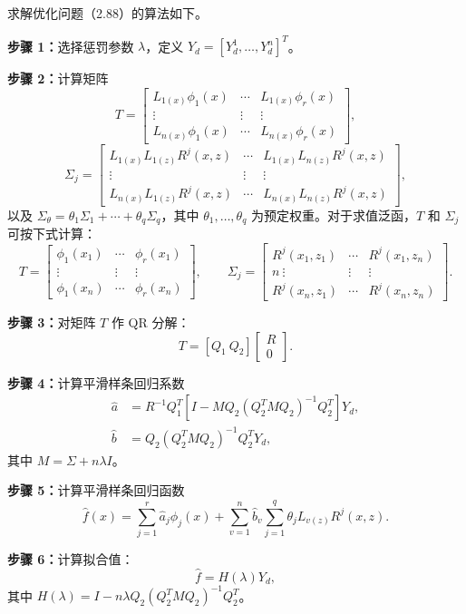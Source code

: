 求解优化问题（2.88）的算法如下。

\noindent\textbf{步骤 1：}选择惩罚参数 $\lambda$，定义 $Y_d=[Y_d^1,\ldots,Y_d^n]^T$。

\noindent\textbf{步骤 2：}计算矩阵
\[
T=\begin{bmatrix}
L_{1(x)}\phi_1(x)&\cdots&L_{1(x)}\phi_r(x)\\
\vdots&\vdots&\vdots\\
L_{n(x)}\phi_1(x)&\cdots&L_{n(x)}\phi_r(x)
\end{bmatrix},
\]
\[
\Sigma_j=\begin{bmatrix}
L_{1(x)}L_{1(z)}R^j(x,z)&\cdots&L_{1(x)}L_{n(z)}R^j(x,z)\\
\vdots&\vdots&\vdots\\
L_{n(x)}L_{1(z)}R^j(x,z)&\cdots&L_{n(x)}L_{n(z)}R^j(x,z)
\end{bmatrix},
\]
以及 $\Sigma_\theta=\theta_1\Sigma_1+\cdots+\theta_q\Sigma_q$，其中 $\theta_1,\ldots,\theta_q$ 为预定权重。对于求值泛函，$T$ 和 $\Sigma_j$ 可按下式计算：
\[
T=\begin{bmatrix}
\phi_1(x_1)&\cdots&\phi_r(x_1)\\\vdots&\vdots&\vdots\\
\phi_1(x_n)&\cdots&\phi_r(x_n)
\end{bmatrix},
\qquad
\Sigma_j=\begin{bmatrix}
R^j(x_1,z_1)&\cdots&R^j(x_1,z_n)\\
n\ \vdots&\vdots&\vdots\\
R^j(x_n,z_1)&\cdots&R^j(x_n,z_n)
\end{bmatrix}.
\]

\noindent\textbf{步骤 3：}对矩阵 $T$ 作 QR 分解：
\[
T=[Q_1\ Q_2]\begin{bmatrix}R\\0\end{bmatrix}.
\]

\noindent\textbf{步骤 4：}计算平滑样条回归系数
\[
\begin{aligned}
\widehat a&=R^{-1}Q_1^T[I-MQ_2(Q_2^TMQ_2)^{-1}Q_2^T]Y_d,\\
\widehat b&=Q_2(Q_2^TMQ_2)^{-1}Q_2^TY_d,
\end{aligned}
\]
其中 $M=\Sigma+n\lambda I$。

\noindent\textbf{步骤 5：}计算平滑样条回归函数
\[
\widehat f(x)=\sum_{j=1}^{r}\widehat a_j\phi_j(x)
+\sum_{v=1}^{n}\widehat b_v\sum_{j=1}^{q}\theta_jL_{v(z)}R^j(x,z).
\]

\noindent\textbf{步骤 6：}计算拟合值：
\[
\widehat f=H(\lambda)Y_d,
\]
其中 $H(\lambda)=I-n\lambda Q_2(Q_2^TMQ_2)^{-1}Q_2^T$。

